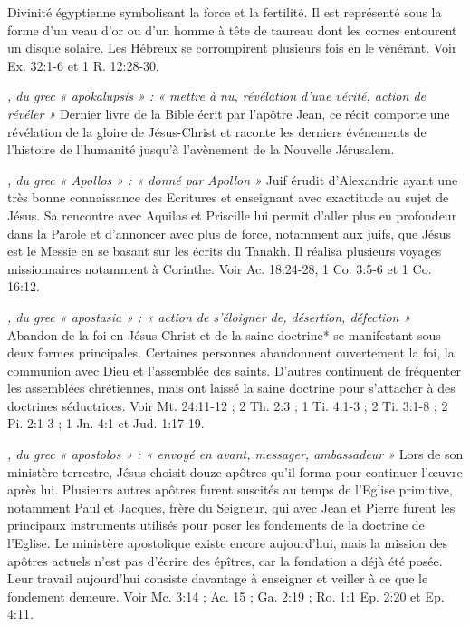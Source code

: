 \begin{multicols}{2}
{\textit{}\newline
Divinité égyptienne symbolisant la force et la fertilité. Il est représenté sous la forme d'un veau d'or ou d'un homme à tête de taureau dont les cornes entourent un disque solaire. Les Hébreux se corrompirent plusieurs fois en le vénérant. Voir Ex. 32:1-6 et 1 R. 12:28-30.

\textit{, du grec « apokalupsis » : « mettre à nu, révélation d'une vérité, action de révéler »}\newline
Dernier livre de la Bible écrit par l'apôtre Jean, ce récit comporte une révélation de la gloire de Jésus-Christ et raconte les derniers événements de l'histoire de l'humanité jusqu'à l'avènement de la Nouvelle Jérusalem.

\textit{, du grec « Apollos » : « donné par Apollon »}\newline
Juif érudit d'Alexandrie ayant une très bonne connaissance des Ecritures et enseignant avec exactitude au sujet de Jésus. Sa rencontre avec Aquilas et Priscille lui permit d'aller plus en profondeur dans la Parole et d'annoncer avec plus de force, notamment aux juifs, que Jésus est le Messie en se basant sur les écrits du Tanakh. Il réalisa plusieurs voyages missionnaires notamment à Corinthe. Voir Ac. 18:24-28, 1 Co. 3:5-6 et 1 Co. 16:12.

\textit{, du grec « apostasia » : « action de s'éloigner de, désertion, défection »}\newline
Abandon de la foi en Jésus-Christ et de la saine doctrine* se manifestant sous deux formes principales. Certaines personnes abandonnent ouvertement la foi, la communion avec Dieu et l'assemblée des saints. D'autres continuent de fréquenter les assemblées chrétiennes, mais ont laissé la saine doctrine pour s'attacher à des doctrines séductrices. Voir Mt. 24:11-12 ; 2 Th. 2:3 ; 1 Ti. 4:1-3 ; 2 Ti. 3:1-8 ; 2 Pi. 2:1-3 ; 1 Jn. 4:1 et Jud. 1:17-19.

\textit{, du grec « apostolos » : « envoyé en avant, messager, ambassadeur »}\newline
Lors de son ministère terrestre, Jésus choisit douze apôtres qu'il forma pour continuer l'œuvre après lui. Plusieurs autres apôtres furent suscités au temps de l'Eglise primitive, notamment Paul et Jacques, frère du Seigneur, qui avec Jean et Pierre furent les principaux instruments utilisés pour poser les fondements de la doctrine de l'Eglise. Le ministère apostolique existe encore aujourd'hui, mais la mission des apôtres actuels n'est pas d'écrire des épîtres, car la fondation a déjà été posée. Leur travail aujourd'hui consiste davantage à enseigner et veiller à ce que le fondement demeure. Voir Mc. 3:14 ; Ac. 15 ; Ga. 2:19 ; Ro. 1:1 Ep. 2:20 et Ep. 4:11.

}
\end{multicols}
